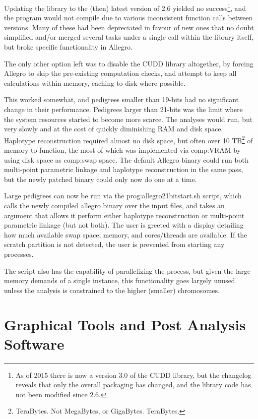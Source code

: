Updating the library to the (then) latest version of 2.6 yielded no success\footnote{As of 2015 there is now a version 3.0 of the CUDD library, but the changelog  reveals that only the overall packaging has changed, and the library code has not been modified since 2.6.}, and the program would not compile due to various inconsistent function calls between versions. Many of these had been depreciated in favour of new ones that no doubt simplified and/or merged several tasks under a single call within the library itself, but broke specific functionality in Allegro.

The only other option left was to disable the CUDD library altogether, by forcing Allegro to skip the pre-existing computation checks, and attempt to keep all calculations within memory, caching to disk where possible.

This worked somewhat, and pedigrees smaller than 19-bits had no significant change in their performance. Pedigrees larger than 21-bits was the limit where the system resources started to become more scarce. The analyses would run, but very slowly and at the cost of quickly diminishing RAM and disk space. Haplotype reconstruction required almost no disk space, but often over 10 TB\footnote{TeraBytes. Not MegaBytes, or GigaBytes. TeraBytes.} of memory to function, the most of which was implemented via \gls{comp:VRAM} by using disk space as \gls{comp:swap space}. The default Allegro binary could run both multi-point parametric linkage and haplotype reconstruction in the same pass, but the newly patched binary could only now do one at a time.

Large pedigrees can now be run via the \gls{prog:allegro21bitstart.sh} script, which calls  the newly compiled allegro binary over the input files, and takes an argument that allows it perform either haplotype reconstruction or multi-point parametric linkage (but not both). The user is greeted with a display detailing how much available swap space, memory, and cores/threads are available. If the scratch partition is not detected, the user is prevented from starting any processes. 

The script also has the capability of parallelizing the process, but given the large memory demands of a single instance, this functionality goes largely unused unless the analysis is constrained to the higher (smaller) chromosomes. 


\section{Graphical Tools and Post Analysis Software}


